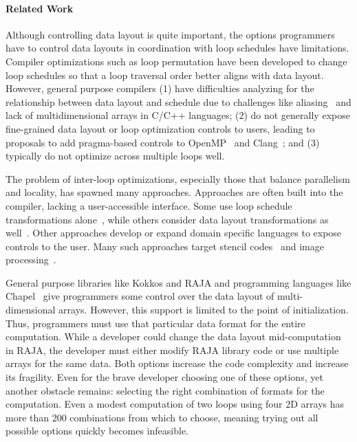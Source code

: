 \documentclass{article}
\begin{document}
\paragraph{Related Work}
Although controlling data layout is quite important, the options programmers have to control
data layouts in coordination with loop schedules have limitations.
Compiler optimizations such as loop permutation have been developed to change loop
schedules so that a loop traversal order better aligns with data layout.
However, general purpose compilers 
(1) have difficulties analyzing for the relationship between
data layout and schedule due to challenges like aliasing~\cite{hind2001pointer} and lack of multidimensional arrays in 
C/C++ languages; 
(2) do not generally expose fine-grained data layout or loop optimization
controls to users, leading to proposals to add pragma-based controls to OpenMP~\cite{kruse2019design} and Clang~\cite{kruse2018user}; and 
(3) typically do not optimize across multiple loops well.

The problem of inter-loop optimizations, especially those that balance parallelism and locality, has spawned many approaches. 
Approaches are often built into the compiler, lacking a user-accessible interface.
Some use loop schedule transformations alone~\cite{wolf1991data,mckinley1996improving}, while others consider data layout transformations as well~\cite{cierniak1995unifying,kennedy1995automatic,kandemir1998improving,  chen2005constraint, chen2005integrating, ozturk2011data}.
Other approaches develop or expand domain specific languages to expose controls to the user.
Many such approaches target stencil codes~\cite{henretty2011data,kronawitter2018automatic,luporini2018design} and image processing~\cite{ragan-kelley2013halide,mullapudi2015polymage}.

General purpose libraries like Kokkos and RAJA and programming languages like Chapel~\cite{diaconescu2007approach} give programmers some control over the data layout of multi-dimensional arrays. However, this support is limited to the point of initialization.
Thus, programmers must use that particular data format for the entire computation.
While a developer could change the data layout mid-computation in RAJA, the developer must either modify RAJA library code or use multiple arrays for the same data. 
Both options increase the code complexity and increase its fragility.
Even for the brave developer choosing one of these options, yet another obstacle remains: selecting the right combination of formats for the computation.
Even a modest computation of two loops using four 2D arrays has more than 200 combinations from which to choose, meaning trying out all possible options quickly becomes infeasible. 
\end{document}
